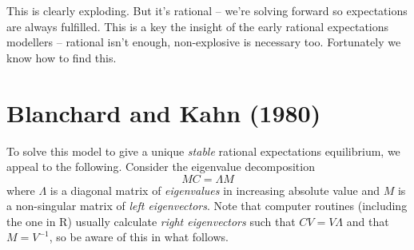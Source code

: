 \documentclass[
  letterpaper,
]{book}
\begin{document}
This is clearly exploding. But it's rational -- we're solving forward so
expectations are always fulfilled. This is a key the insight of the
early rational expectations modellers -- rational isn't enough,
non-explosive is necessary too. Fortunately we know how to find this.

\hypertarget{bk80}{%
\section{Blanchard and Kahn (1980)}\label{bk80}}

To solve this model to give a unique \emph{stable} rational expectations
equilibrium, we appeal to the following. Consider the eigenvalue
decomposition \[
  MC=\Lambda M
\] where \(\Lambda\) is a diagonal matrix of \emph{eigenvalues} in
increasing absolute value and \(M\) is a non-singular matrix of
\emph{left eigenvectors}. Note that computer routines (including the one
in R) usually calculate \emph{right eigenvectors} such that
\(CV=V\Lambda\) and that \(M=V^{-1}\), so be aware of this in what
follows.
\end{document}
